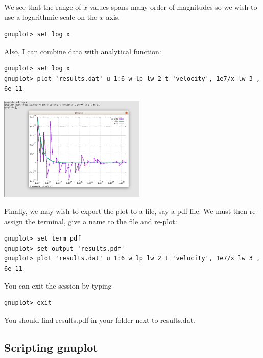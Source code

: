 We see that the range of $x$ values spans many order of magnitudes so we wish to use 
a logarithmic scale on the $x$-axis. 
\begin{mdframed}[backgroundcolor=gray!10]
\begin{verbatim}
gnuplot> set log x
\end{verbatim}
\end{mdframed}
Also, I can combine data with analytical function:
\begin{mdframed}[backgroundcolor=gray!10]
\begin{verbatim}
gnuplot> set log x
gnuplot> plot 'results.dat' u 1:6 w lp lw 2 t 'velocity', 1e7/x lw 3 , 6e-11 
\end{verbatim}
\end{mdframed}

\begin{center}
\includegraphics[width=7cm]{images/gnuplot/gnuplot5}
\end{center}
Finally, we may wish to export the plot to a file, say a pdf file. We must then 
re-assign the terminal, give a name to the file and re-plot:
\begin{mdframed}[backgroundcolor=gray!10]
\begin{verbatim}
gnuplot> set term pdf
gnuplot> set output 'results.pdf'
gnuplot> plot 'results.dat' u 1:6 w lp lw 2 t 'velocity', 1e7/x lw 3 , 6e-11 
\end{verbatim}
\end{mdframed}
You can exit the session by typing
\begin{mdframed}[backgroundcolor=gray!10]
\begin{verbatim}
gnuplot> exit 
\end{verbatim}
\end{mdframed}
You should find {\filenamefont results.pdf} in your folder next to {\filenamefont results.dat}.

\subsection*{Scripting gnuplot}

